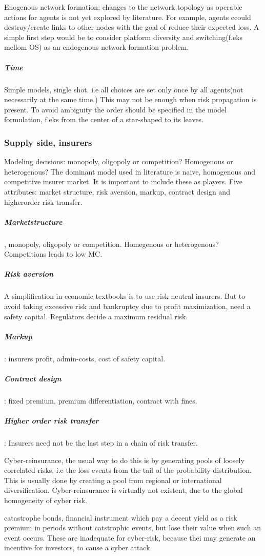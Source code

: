 Enogenous network formation: changes to the network topology as operable actions for agents is not yet explored by literature.
For example, agents ccould destroy/create links to other nodes with the goal of reduce their expected loss. 
A simple first step would be to consider platform diversity and switching(f.eks mellom OS) as an endogenous network formation problem. 

\subparagraph{Time}
Simple models, single shot. i.e all choices are set only once by all agents(not necessarily at the same time.)
This may not be enough when risk propagation is present. To avoid ambiguity the order should be specified in the model formulation, f.eks from the center of a star-shaped to its leaves.
\subsubsection{Supply side, insurers}
Modeling decisions: monopoly, oligopoly or competition? Homogenous or heterogenous?
The dominant model used in literature is naive, homogenous and competitive insurer market. 
It is important to include these as players. 
Five attributes: market structure, risk aversion, markup, contract design and higherorder risk transfer.
\subparagraph{ Marketstructure}, monopoly, oligopoly or competition. Homegenous or heterogenous? 
Competitions leads to low MC. 
\subparagraph{ Risk aversion} A simplification in economic textbooks is to use risk neutral insurers.
But to avoid taking excessive risk and bankruptcy due to profit maximization, need a safety capital. Regulators decide a maximum residual risk. 
\subparagraph{Markup}: insurers profit, admin-costs, cost of safety capital. 
\subparagraph{Contract design}: fixed premium, premium differentiation, contract with fines.
\subparagraph{Higher order risk transfer}:
Insurers need not be the last step in a chain of risk transfer. 

Cyber-reinsurance, the usual way to do this is by generating pools of loosely correlated risks, i.e the loss events from the tail of the probability distribution. This is usually done by creating a pool from regional or international diversification. Cyber-reinsurance is virtually not existent, due to the global homogeneity of cyber risk. 

catastrophe bonds, financial instrument which pay a decent yield as a risk premium in periods without 
catstrophic events, but lose their value when such an event occurs. 
These are inadequate for cyber-risk, because thei may generate an incentive for investors, 
to cause a cyber attack.

